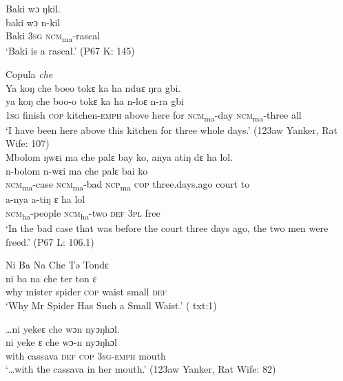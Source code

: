   Baki  wɔ  ŋkil.\\
\gll baki    wɔ      n-kil\\
Baki    \textsc{3sg}    \textsc{ncm}\textsubscript{ma}\textsc{{}-}rascal\\
\glt ‘Baki is a rascal.' (P67 K: 145)
 \z

\ea%
    \label{ex:95}
  Copula \textit{che}\\

\ea Ya koŋ che boeo tokɛ ka ha nduɛ ŋra gbi.\\
\gll ya    koŋ    che  boo-o        tokɛ    ka    ha    n-loɛ      n-ra        gbi\\
  \textsc{1sg}  finish    \textsc{cop}  kitchen-\textsc{emph}  above    here  for     \textsc{ncm}\textsubscript{ma}{}-day  \textsc{ncm}\textsubscript{ma}{}-three  all\\
\glt ‘I have been here above this kitchen for three whole days.' (123aw Yanker, Rat Wife: 107)\\

\ex Mbolom   ŋwɛi   ma che\footnotemark{}  palɛ bay ko, anya atiŋ dɛ ha lol.\\
\gll n-bolom      n-wɛi      ma    che  palɛ          bai    ko\\
\textsc{ncm}\textsubscript{ma}{}-case    \textsc{ncm}\textsubscript{ma}{}-bad  \textsc{ncp}\textsubscript{ma}    \textsc{cop}  three.days.ago    court    to\\
\gll a-nya        a-tiŋ      ɛ    ha    lol\\
\textsc{ncm}\textsubscript{ha}{}-people  \textsc{ncm}\textsubscript{ha}{}-two  \textsc{def}  \textsc{3pl}  free\\
\glt ‘In the bad case that was before the court three days ago, the two men were freed.' (P67 L: 106.1)

\ex Ni Ba Na Che Tə Tondɛ\\
\gll ni    ba      na      che  ter    ton    ɛ\\
why  mister  spider  \textsc{cop}  waist  small    \textsc{def}\\
\glt ‘Why Mr Spider Has Such a Small Waist.' (\citealt{Sumner1921} txt:1)

\ex  …ni yekeɛ che wɔn   nyɔŋhɔl.\\
\gll ni    yeke    ɛ    che  wɔ{}-n      nyɔŋhɔl\\
with  cassava  \textsc{def}  \textsc{cop}  \textsc{3sg-emph}  mouth\\
\glt ‘…with the cassava in her mouth.' (123aw Yanker, Rat Wife: 82)
\z
\z


